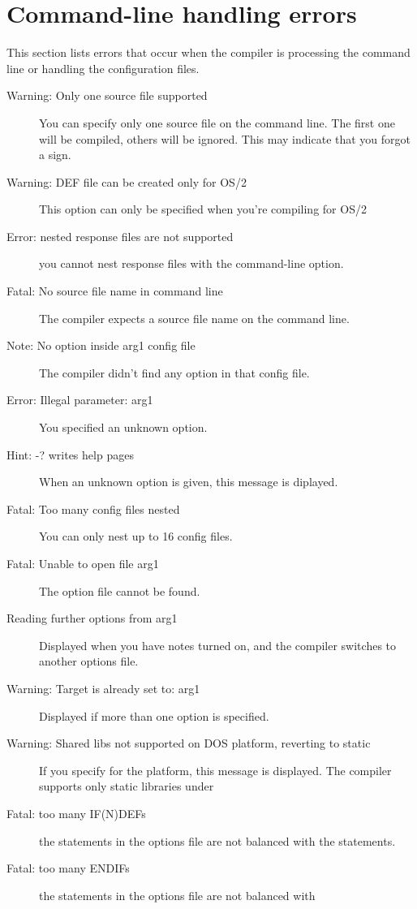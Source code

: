  \section{Command-line handling errors}
 This section lists errors that occur when the compiler is processing the
 command line or handling the configuration files.
 \begin{description}
\item [Warning: Only one source file supported]
 You can specify only one source file on the command line. The first
 one will be compiled, others will be ignored. This may indicate that
 you forgot a  sign.
\item [Warning: DEF file can be created only for OS/2]
 This option can only be specified when you're compiling for OS/2
\item [Error: nested response files are not supported]
 you cannot nest response files with the  command-line option.
\item [Fatal: No source file name in command line]
 The compiler expects a source file name on the command line.
\item [Note: No option inside arg1 config file]
 The compiler didn't find any option in that config file.
\item [Error: Illegal parameter: arg1]
 You specified an unknown option.
\item [Hint: -? writes help pages]
 When an unknown option is given, this message is diplayed.
\item [Fatal: Too many config files nested]
 You can only nest up to 16 config files.
\item [Fatal: Unable to open file arg1]
 The option file cannot be found.
\item [Reading further options from arg1]
 Displayed when you have notes turned on, and the compiler switches
 to another options file.
\item [Warning: Target is already set to: arg1]
 Displayed if more than one  option is specified.
\item [Warning: Shared libs not supported on DOS platform, reverting to static]
 If you specify  for the \dos platform, this message is displayed.
 The compiler supports only static libraries under \dos
\item [Fatal: too many IF(N)DEFs]
 the  statements in the options file are not balanced with
 the  statements.
\item [Fatal: too many ENDIFs]
 the  statements in the options file are not balanced with

\end{description}
